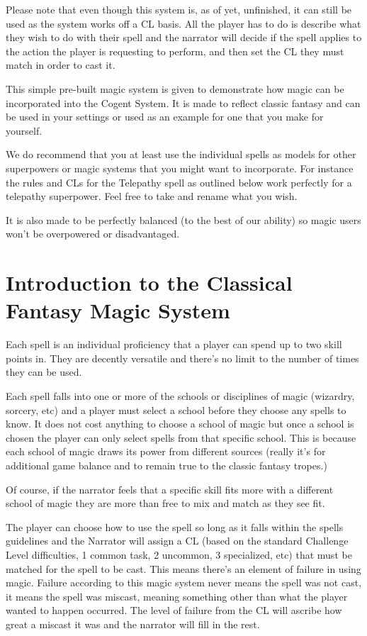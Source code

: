Please note that even though this system is, as of yet, unfinished, it can still be used as the system works off a CL basis. All the player has to do is describe what they wish to do with their spell and the narrator will decide if the spell applies to the action the player is requesting to perform, and then set the CL they must match in order to cast it.

This simple pre-built magic system is given to demonstrate how magic can be incorporated into the Cogent System. It is made to reflect classic fantasy and can be used in your settings or used as an example for one that you make for yourself.

We do recommend that you at least use the individual spells as models for other superpowers or magic systems that you might want to incorporate. For instance the rules and CLs for the Telepathy spell as outlined below work perfectly for a telepathy superpower. Feel free to take and rename what you wish.

It is also made to be perfectly balanced (to the best of our ability) so magic users won’t be overpowered or disadvantaged.

\section{Introduction to the Classical Fantasy Magic System}

Each spell is an individual proficiency that a player can spend up to two skill points in. They are decently versatile and there’s no limit to the number of times they can be used.

Each spell falls into one or more of the schools or disciplines of magic (wizardry, sorcery, etc) and a player must select a school before they choose any spells to know. It does not cost anything to choose a school of magic but once a school is chosen the player can only select spells from that specific school. This is because each school of magic draws its power from different sources (really it’s for additional game balance and to remain true to the classic fantasy tropes.)

Of course, if the narrator feels that a specific skill fits more with a different school of magic they are more than free to mix and match as they see fit.

The player can choose how to use the spell so long as it falls within the spells guidelines and the Narrator will assign a CL (based on the standard Challenge Level difficulties, 1 common task, 2 uncommon, 3 specialized, etc) that must be matched for the spell to be cast. This means there’s an element of failure in using magic. Failure according to this magic system never means the spell was not cast, it means the spell was miscast, meaning something other than what the player wanted to happen occurred. The level of failure from the CL will ascribe how great a miscast it was and the narrator will fill in the rest.

